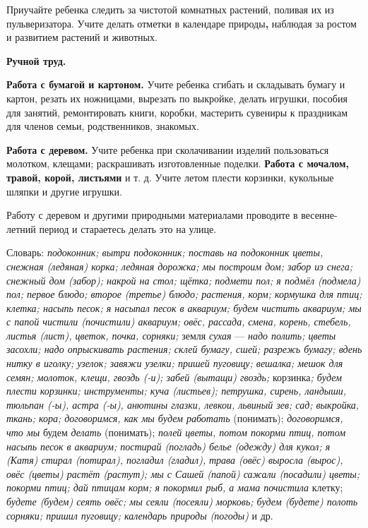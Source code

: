 \documentclass[a5paper]{book}
\renewcommand{\emph}[1]{\textit{#1}}
\begin{document}
Приучайте ребенка следить за чистотой комнатных растений, поливая их из
пульверизатора. Учите делать отметки в календаре природы\textbf{,}
наблюдая за ростом и развитием растений и животных.

\textbf{Ручной труд.}

\textbf{Работа с бумагой и картоном.} Учите ребенка сгибать и складывать
бумагу и картон, резать их ножницами, вырезать по выкройке, делать
игрушки, пособия для занятий, ремонтировать книги, коробки, мастерить
сувениры к праздникам для членов семьи, родственников, знакомых.

\textbf{Работа с деревом.} Учите ребенка при сколачивании изделий
пользоваться молотком, клещами; раскрашивать изготовленные поделки.
\textbf{Работа с мочалом, травой, корой, листьями} и т. д. Учите летом
плести корзинки, кукольные шляпки и другие игрушки.

Работу с деревом и другими природными материалами проводите в
весенне-летний период и стараетесь делать это на улице.

Словарь: \emph{подоконник; вытри подоконник; поставь на подоконник
цветы, снежная (ледяная) корка; ледяная дорожка; мы построим дом; забор
из снега; снежный дом (забор); накрой на стол; щётка; подмети пол; я
подмёл (подмела) пол; первое блюдо; второе (третье) блюдо; растения,
корм; кормушка для птиц; клетка; насыпь песок; я насыпал песок в
аквариум; будем чистить аквариум; мы с папой чистили (почистили)
аквариум; овёс, рассада,} \emph{смена, корень, стебель, листья (лист),
цветок, почка, сорняки;} земля \emph{сухая} --- \emph{надо полить; цветы
засохли; надо опрыскивать растения; склей бумагу, сшей; разрежь бумагу;
вдень нитку в иголку; узелок; завяжи узелки; пришей пуговицу; вешалка;
мешок для семян; молоток, клещи, гвоздь (-и); забей (вытащи) гвоздь;}
корзинка\emph{; будем плести корзинки; инструменты; куча (листьев);
петрушка, сирень, ландыши, тюльпан (-ы), астра (-ы), анютины глазки,
левкои, львиный зев; сад; выкройка, ткань; кора; договоримся, как мы
будем работать} (понимать); \emph{договоримся, что мы} будем
\emph{делать} (понимать); \emph{полей цветы, потом покорми птиц, потом
насыпь песок в аквариум; постирай (погладь) белье (одежду) для кукол; я
(Катя) стирал (потирал), погладил (гладил),} \emph{трава (овёс) выросла
(вырос), овёс (цветы) растёт (растут); мы с Сашей (папой) сажали
(посадили) цветы; покорми птиц; дай птицам корм; я покормил рыб, а мама
почистила} клетку; \emph{будете (будем) сеять овёс; мы сеяли (посеяли)
морковь; будем (будете) полоть сорняки; пришил пуговицу; календарь
природы (погоды)} и др.
\end{document}

